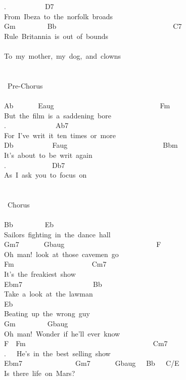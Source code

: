 {.\ \ \ \ \ \ \ \ \ \ \ D7\\
From\ Ibeza\ to\ the\ norfolk\ broads\\
Gm\ \ \ \ \ \ \ \ \ Bb\ \ \ \ \ \ \ \ \ \ \ \ \ \ \ \ \ \ \ \ \ \ \ \ \ \ \ \ \ \ \ \ \ C7\\
Rule\ Britannia\ is\ out\ of\ bounds\\
\\
To\ my\ mother,\ my\ dog,\ and\ clowns\\
\\
\\
\lbrack\ Pre-Chorus\rbrack\\
\\
Ab\ \ \ \ \ \ \ Eaug\ \ \ \ \ \ \ \ \ \ \ \ \ \ \ \ \ \ \ \ \ \ \ \ \ \ \ \ \ \ Fm\\
But\ the\ film\ is\ a\ saddening\ bore\\
.\ \ \ \ \ \ \ \ \ \ \ \ \ \ Ab7\\
For\ I've\ writ\ it\ ten\ times\ or\ more\\
Db\ \ \ \ \ \ \ \ \ \ \ Faug\ \ \ \ \ \ \ \ \ \ \ \ \ \ \ \ \ \ \ \ \ \ \ \ \ \ \ Bbm\\
It's\ about\ to\ be\ writ\ again\\
.\ \ \ \ \ \ \ \ \ \ \ \ \ Db7\\
As\ I\ ask\ you\ to\ focus\ on\\
\\
\\
\lbrack\ Chorus\rbrack\\
\\
Bb\ \ \ \ \ \ \ \ \ Eb\\
Sailors\ fighting\ in\ the\ dance\ hall\\
Gm7\ \ \ \ \ \ \ Gbaug\ \ \ \ \ \ \ \ \ \ \ \ \ \ \ \ \ \ \ \ \ \ \ \ \ \ F\\
Oh\ man!\ look\ at\ those\ cavemen\ go\\
Fm\ \ \ \ \ \ \ \ \ \ \ \ \ \ \ \ \ \ \ \ \ \ Cm7\\
It's\ the\ freakiest\ show\\
Ebm7\ \ \ \ \ \ \ \ \ \ \ \ \ \ \ \ \ \ \ \ Bb\\
Take\ a\ look\ at\ the\ lawman\\
Eb\\
Beating\ up\ the\ wrong\ guy\\
Gm\ \ \ \ \ \ \ \ \ Gbaug\\
Oh\ man!\ Wonder\ if\ he'll\ ever\ know\\
F\ \ Fm\ \ \ \ \ \ \ \ \ \ \ \ \ \ \ \ \ \ \ \ \ \ \ \ \ \ \ \ \ \ \ \ \ \ \ \ Cm7\\
.\ \ \ He's\ in\ the\ best\ selling\ show\\
Ebm7\ \ \ \ \ \ \ \ \ \ \ \ \ \ \ Gm7\ \ \ \ \ \ \ Gbaug\ \ \ Bb\ \ \ C/E\\
Is\ there\ life\ on\ Mars?}
